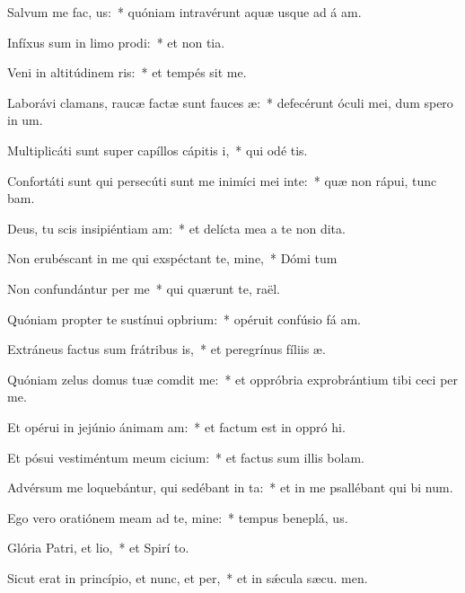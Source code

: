 \item Salvum me fac, us:~* quóniam intravérunt aquæ usque ad á am.
\item Infíxus sum in limo prodi:~* et non  tia.
\item Veni in altitúdinem ris:~* et tempés sit me.
\item Laborávi clamans, raucæ factæ sunt fauces æ:~* defecérunt óculi mei, dum spero in  um.
\item Multiplicáti sunt super capíllos cápitis i,~* qui odé  tis.
\item Confortáti sunt qui persecúti sunt me inimíci mei inte:~* quæ non rápui, tunc bam.
\item Deus, tu scis insipiéntiam am:~* et delícta mea a te non  dita.
\item Non erubéscant in me qui exspéctant te, mine,~* Dómi tum
\item Non confundántur per me~* qui quærunt te,  raël.
\item Quóniam propter te sustínui opbrium:~* opéruit confúsio fá am.
\item Extráneus factus sum frátribus is,~* et peregrínus fíliis  æ.
\item Quóniam zelus domus tuæ comdit me:~* et oppróbria exprobrántium tibi ceci per me.
\item Et opérui in jejúnio ánimam am:~* et factum est in oppró hi.
\item Et pósui vestiméntum meum cicium:~* et factus sum illis  bolam.
\item Advérsum me loquebántur, qui sedébant in ta:~* et in me psallébant qui bi num.
\item Ego vero oratiónem meam ad te, mine:~* tempus beneplá, us.
\item Glória Patri, et lio,~* et Spirí to.
\item Sicut erat in princípio, et nunc, et per,~* et in sǽcula sæcu. men.
